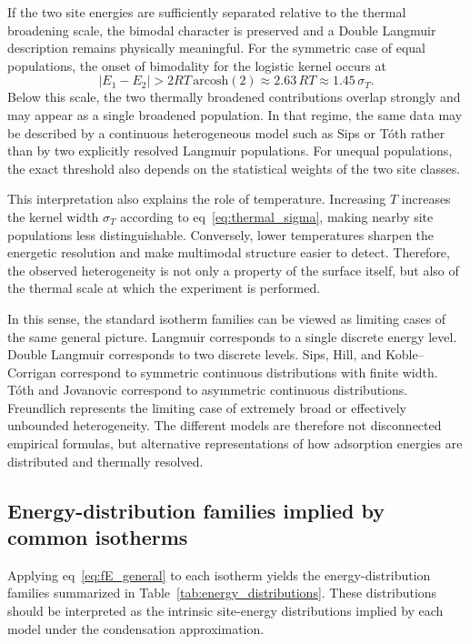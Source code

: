 \documentclass[journal=jacsat,manuscript=article]{achemso}
\begin{document}
	If the two site energies are sufficiently separated relative to the thermal broadening scale, the bimodal character is preserved and a Double Langmuir description remains physically meaningful. For the symmetric case of equal populations, the onset of bimodality for the logistic kernel occurs at
	\begin{equation}
		|E_1-E_2| > 2RT\,\mathrm{arcosh}(2) \approx 2.63\,RT \approx 1.45\,\sigma_T.
	\end{equation}
	Below this scale, the two thermally broadened contributions overlap strongly and may appear as a single broadened population. In that regime, the same data may be described by a continuous heterogeneous model such as Sips or T\'{o}th rather than by two explicitly resolved Langmuir populations. For unequal populations, the exact threshold also depends on the statistical weights of the two site classes.
	
	This interpretation also explains the role of temperature. Increasing $T$ increases the kernel width $\sigma_T$ according to eq~\eqref{eq:thermal_sigma}, making nearby site populations less distinguishable. Conversely, lower temperatures sharpen the energetic resolution and make multimodal structure easier to detect. Therefore, the observed heterogeneity is not only a property of the surface itself, but also of the thermal scale at which the experiment is performed.
	
	In this sense, the standard isotherm families can be viewed as limiting cases of the same general picture. Langmuir corresponds to a single discrete energy level. Double Langmuir corresponds to two discrete levels. Sips, Hill, and Koble--Corrigan correspond to symmetric continuous distributions with finite width. T\'{o}th and Jovanovic correspond to asymmetric continuous distributions. Freundlich represents the limiting case of extremely broad or effectively unbounded heterogeneity. The different models are therefore not disconnected empirical formulas, but alternative representations of how adsorption energies are distributed and thermally resolved.
	
	\subsection{Energy-distribution families implied by common isotherms}
	\label{sec:energy_families}
	
	Applying eq~\eqref{eq:fE_general} to each isotherm yields the energy-distribution families summarized in Table~\ref{tab:energy_distributions}. These distributions should be interpreted as the intrinsic site-energy distributions implied by each model under the condensation approximation.
	
\end{document}
